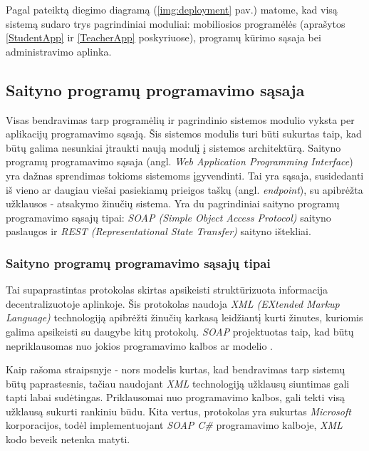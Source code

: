 \documentclass{VUMIFPSkursinis}
\begin{document}
Pagal pateiktą diegimo diagramą (\ref{img:deployment} pav.) matome, kad visą sistemą sudaro trys pagrindiniai moduliai: mobiliosios programėlės (aprašytos \ref{StudentApp} ir \ref{TeacherApp} poskyriuose), programų kūrimo sąsaja bei administravimo aplinka.

\subsection{Saityno programų programavimo sąsaja} \label{webApi}

Visas bendravimas tarp programėlių ir pagrindinio sistemos modulio vyksta per aplikacijų programavimo sąsają. Šis sistemos modulis turi būti sukurtas taip, kad būtų galima nesunkiai įtraukti naują modulį į sistemos architektūrą. Saityno programų programavimo sąsaja (angl. \textit{Web Application Programming Interface}) yra dažnas sprendimas tokioms sistemoms įgyvendinti. Tai yra sąsaja, susidedanti iš vieno ar daugiau viešai pasiekiamų prieigos taškų (angl. \textit{endpoint}), su apibrėžta užklausos - atsakymo žinučių sistema. Yra du pagrindiniai saityno programų programavimo sąsajų tipai: \textit{SOAP (Simple Object Access Protocol)} saityno paslaugos ir \textit{REST (Representational State Transfer)} saityno ištekliai.

\subsubsection{Saityno programų programavimo sąsajų tipai}


Tai supaprastintas protokolas skirtas apsikeisti struktūrizuota informacija decentralizuotoje aplinkoje. Šis protokolas naudoja \textit{XML (EXtended Markup Language)} technologiją apibrėžti žinučių karkasą leidžiantį kurti žinutes, kuriomis galima apsikeisti su daugybe kitų protokolų. \textit{SOAP} projektuotas taip, kad būtų nepriklausomas nuo jokios programavimo kalbos ar modelio \cite{SoapDocs}.

Kaip rašoma straipsnyje \cite{SoapRest} - nors modelis kurtas, kad bendravimas tarp sistemų būtų paprastesnis, tačiau naudojant \textit{XML} technologiją užklausų siuntimas gali tapti labai sudėtingas. Priklausomai nuo programavimo kalbos, gali tekti visą užklausą sukurti rankiniu būdu. Kita vertus, protokolas yra sukurtas \textit{Microsoft} korporacijos, todėl implementuojant \textit{SOAP C\#} programavimo kalboje, \textit{XML} kodo beveik netenka matyti.
\end{document}
